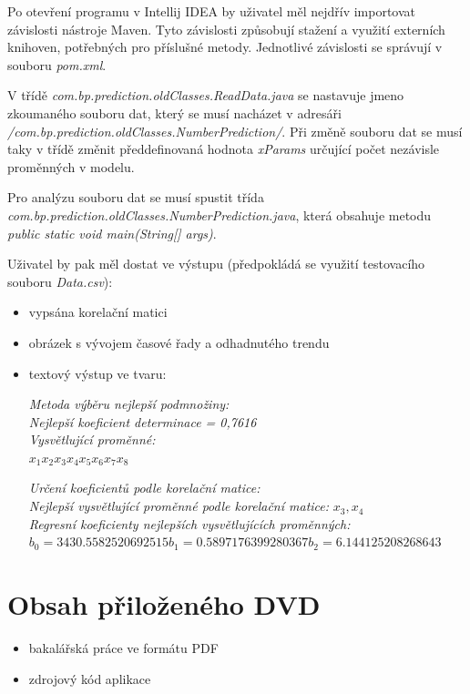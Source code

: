 \documentclass[a4paper,12pt,twoside]{scrreprt}
\begin{document}
Po otevření programu v Intellij IDEA by uživatel měl nejdřív importovat závislosti nástroje Maven. Tyto závislosti způsobují stažení a využití externích knihoven, potřebných pro příslušné metody. Jednotlivé závislosti se správují v souboru \textit{pom.xml}. 

V třídě \textit{com.bp.prediction.oldClasses.ReadData.java} se nastavuje jmeno zkoumaného souboru dat, který se musí nacházet v adresáři \textit{/com.bp.prediction.oldClasses.NumberPrediction/}. Při změně souboru dat se musí taky v třídě změnit předdefinovaná hodnota \textit{xParams} určující počet nezávisle proměnných v modelu.

Pro analýzu souboru dat se musí spustit třída \textit{com.bp.prediction.oldClasses.NumberPrediction.java}, která obsahuje metodu \textit{public static void main(String[] args)}.

Uživatel by pak měl dostat ve výstupu (předpokládá se využití testovacího souboru \textit{Data.csv}):

\begin{itemize}
\item vypsána korelační matici 
\item obrázek s vývojem časové řady a odhadnutého trendu
\item textový výstup ve tvaru:

\textit{Metoda výběru nejlepší podmnožiny:} \\
\textit{Nejlepší koeficient determinace = 0,7616} \\
\textit{Vysvětlující proměnné:} \\
$x_1 x_2 x_3 x_4 x_5 x_6 x_7 x_8$

\textit{Určení koeficientů podle korelační matice:} \\
\textit{Nejlepší vysvětlující proměnné podle korelační matice:} $x_3, x_4$ \\
\textit{Regresní koeficienty nejlepších vysvětlujících proměnných:} \\
$b_0 = 3430.5582520692515 b_1 = 0.5897176399280367 b_2 = 6.144125208268643$
\end{itemize}

\chapter{Obsah přiloženého DVD}

\begin{itemize}
\item bakalářská práce ve formátu PDF
\item zdrojový kód aplikace
\end{itemize}
\end{document}
